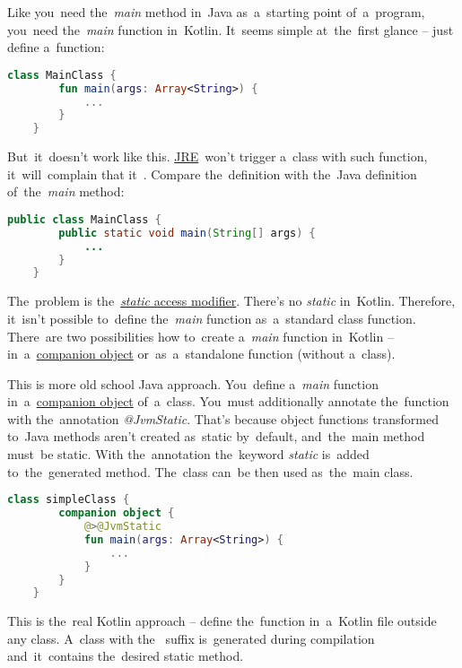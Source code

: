 Like you~need the~\textit{main} method in~Java as~a~starting point of~a~program, you~need the~\textit{main} function in~Kotlin.
It~seems simple at~the~first glance -- just define a~function:
\begin{lstlisting}[language=Kotlin]
    class MainClass {
        fun main(args: Array<String>) {
            ...
        }
    }
\end{lstlisting}

\noindent But~it~doesn't work like this.
\hyperref[jdkjrejvm]{JRE}~won't trigger a~class with such function, it~will~complain that it~.
Compare the~definition with the~Java definition of~the~\textit{main} method:
\begin{lstlisting}[language=Java]
    public class MainClass {
        public static void main(String[] args) {
            ...
        }
    }
\end{lstlisting}

\noindent The~problem is the~\hyperref[javastatic]{\textit{static} access modifier}.
There's no \textit{static} in~Kotlin.
Therefore, it~isn't possible to~define the~\textit{main} function as~a~standard class function.
There~are two possibilities how to~create a~\textit{main} function in~Kotlin -- in~a~\hyperref[kotlincompanionobject]{companion object} or~as~a~standalone function (without a~class).

This is more old school Java approach.
You~define a~\textit{main} function in~a~\hyperref[kotlincompanionobject]{companion object} of~a~class.
You~must additionally annotate the~function with the~annotation \textit{@JvmStatic}.
That's because object functions transformed to~Java methods aren't created as~static by~default, and~the~main method must~be static.
With the~annotation the~keyword \textit{static} is~added to~the~generated method.
The~class can~be then used as~the~main class.

\begin{lstlisting}[language=Kotlin, title={Main function in~a~companion object}]
    class simpleClass {
        companion object {
            @>@JvmStatic
            fun main(args: Array<String>) {
                ...
            }
        }
    }
\end{lstlisting}

This is the~real Kotlin approach -- define the~function in~a~Kotlin file outside any class.
A~class with \mbox{the } suffix is~generated during compilation and~it~contains the~desired static method.

